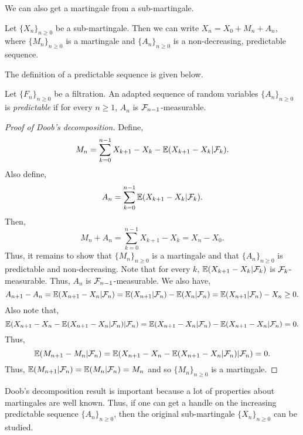 We can also  get a martingale  from a sub-martingale.
\begin{proposition}
    Let $\{X_n\}_{n \ge  0}$  be  a sub-martingale. Then we can write $X_n = X_0+M_n+A_n$, where $\{M_n\}_{n \ge 0}$ is  a martingale and $\{A_n\}_{n \ge 0}$ is a non-decreasing,  predictable  sequence.
\end{proposition}
The definition  of  a predictable  sequence is given below.
\begin{definition}
    Let $\{F_n\}_{n \ge  0}$  be a   filtration. An adapted  sequence of random variables $\{A_n\}_{n \ge 0}$ is \emph{predictable} if for  every $n \ge 1$, $A_n$ is ${\mathcal{F}}_{n-1}$-measurable.
\end{definition}
\begin{proof}[Proof  of Doob's  decomposition]
    Define,
    \[ M_n  = \sum_{k=0}^{n-1} X_{k+1}-X_k - {\mathbb{E}}(X_{k+1}-X_k|{\mathcal{F}}_k). \]
    Also define,
    \[ A_n =  \sum_{k=0}^{n-1}{\mathbb{E}}(X_{k+1}-X_k|{\mathcal{F}}_k). \]
    Then,
    \[M_n+A_n = \sum_{k=0}^{n-1}X_{k+1}-X_k = X_n -X_0. \]
    Thus, it remains to show that $\{M_n\}_{n \ge 0}$ is a martingale and that $\{A_n\}_{n \ge 0}$ is predictable  and non-decreasing. Note  that  for every  $k$,  ${\mathbb{E}}(X_{k+1}-X_k|{\mathcal{F}}_k)$ is  ${\mathcal{F}}_k$-measurable.  Thus, $A_n$  is  ${\mathcal{F}}_{n-1}$-measurable. We also have,
    \[A_{n+1}-A_n = {\mathbb{E}}(X_{n+1}-X_n|{\mathcal{F}}_n) = {\mathbb{E}}(X_{n+1}|{\mathcal{F}}_n)-{\mathbb{E}}(X_n|{\mathcal{F}}_n)={\mathbb{E}}(X_{n+1}|{\mathcal{F}}_n)-X_n \ge  0.\]
    Also note that,
    \[{\mathbb{E}}(X_{n+1}-X_n - {\mathbb{E}}(X_{n+1}-X_n|{\mathcal{F}}_n)|{\mathcal{F}}_n) = {\mathbb{E}}(X_{n+1}-X_n|{\mathcal{F}}_n)-{\mathbb{E}}(X_{n+1}-X_n|{\mathcal{F}}_n) = 0. \]
    Thus,
    \[{\mathbb{E}}(M_{n+1}-M_n|{\mathcal{F}}_n) = {\mathbb{E}}(X_{n+1}-X_n-{\mathbb{E}}(X_{n+1}-X_n|{\mathcal{F}}_n)|{\mathcal{F}}_n) = 0. \]
    Thus, ${\mathbb{E}}(M_{n+1}|{\mathcal{F}}_n) ={\mathbb{E}}(M_n|{\mathcal{F}}_n)=M_n$ and so $\{M_n\}_{n \ge 0}$  is a martingale.
\end{proof}
Doob's  decomposition  result is  important  because  a  lot  of  properties about  martingales  are well known.  Thus,  if one   can  get a handle on the increasing  predictable sequence $\{A_n\}_{n \ge 0}$,  then  the original sub-martingale  $\{X_n\}_{n  \ge 0}$ can  be studied. 
